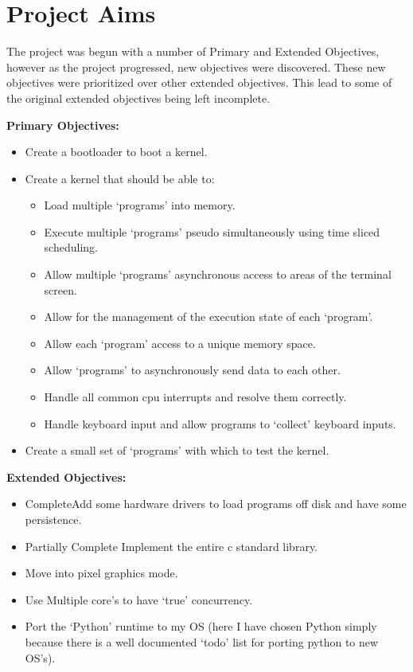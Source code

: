 \documentclass[a4paper]{report}
\begin{document}
\clearpage
\section {Project Aims}

The project was begun with a number of Primary and Extended Objectives, however as the project progressed, new objectives were discovered. These new objectives were prioritized over other extended objectives. This lead to some of the original extended objectives being left incomplete.

\textbf {Primary Objectives:}

\begin{itemize}
\item Create a bootloader to boot a kernel.
\item Create a kernel that should be able to:
\begin{itemize}
\item Load multiple `programs' into memory.
\item Execute multiple `programs' pseudo simultaneously using time sliced scheduling.
\item Allow multiple `programs' asynchronous access to areas of the terminal screen.
\item Allow for the management of the execution state of each `program'.
\item Allow each `program' access to a unique memory space.
\item Allow `programs' to asynchronously send data to each other.
\item Handle all common cpu interrupts and resolve them correctly.
\item Handle keyboard input and allow programs to `collect' keyboard inputs.
\end{itemize}
\item Create a small set of `programs' with which to test the kernel.
\end{itemize}

\textbf {Extended Objectives:}


\begin{itemize}
\item \lbrack Complete\rbrack Add some hardware drivers to load programs off disk and have some persistence.
\item \lbrack Partially Complete \rbrack Implement the entire c standard library.
\item Move into pixel graphics mode.
\item Use Multiple core's to have `true' concurrency.
\item Port the `Python' runtime to my OS (here I have chosen Python simply because there is a well documented `todo' list for porting python to new OS's).
\end{itemize}
\end{document}
